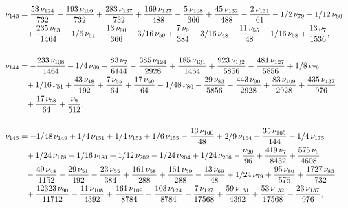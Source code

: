 \documentclass[a4paper,12pt, DIV=14, BCOR=5mm, twoside, headsepline]{scrbook}
\begin{document}
\begin{align}\label{AreaSol13}
\begin{aligned}
\\
\nu_{{143}}&={\frac {53\,\nu_{{124}}}{732}}-{\frac {193\,\nu_{{
109}}}{732}}+{\frac {283\,\nu_{{137}}}{732}}+{\frac {169\,\nu_{{127}}
}{488}}-{\frac {5\,\nu_{{108}}}{366}}+{\frac {45\,\nu_{{132}}}{488}}-{
\frac {2\,\nu_{{131}}}{61}}-1/2\,\nu_{{79}}-1/12\,\nu_{{80}}\\
 &\hphantom{=}+{\frac {
235\,\nu_{{83}}}{1464}}-1/6\,\nu_{{51}}-{\frac {13\,\nu_{{90}}}{366}}-
3/16\,\nu_{{59}}+{\frac {7\,\nu_{{9}}}{384}}-3/16\,\nu_{{48}}-{\frac {
11\,\nu_{{55}}}{48}}-1/16\,\nu_{{58}}+{\frac {13\,\nu_{{7}}}{1536}},\\
\\
\nu_{{144}}&=-{\frac {233\,\nu_{{108}}}{1464}}-1/4\,\nu_{{69}}-{\frac {
83\,\nu_{{7}}}{6144}}-{\frac {385\,\nu_{{124}}}{2928}}+{\frac {185\,
\nu_{{131}}}{1464}}+{\frac {923\,\nu_{{132}}}{5856}}-{\frac {481\,\nu_
{{127}}}{5856}}+1/8\,\nu_{{79}}\\
 &\hphantom{=}+1/16\,\nu_{{51}}+{\frac {43\,\nu_{{48}
}}{192}}+{\frac {7\,\nu_{{55}}}{64}}+{\frac {17\,\nu_{{59}}}{64}}-1/48
\,\nu_{{80}}-{\frac {29\,\nu_{{83}}}{5856}}-{\frac {443\,\nu_{{90}}}{
2928}}+{\frac {83\,\nu_{{109}}}{2928}}+{\frac {435\,\nu_{{137}}}{976}}
\\
 &\hphantom{=}+{\frac {17\,\nu_{{58}}}{64}}+{\frac {\nu_{{9}}}{512}}, \\
\\
\nu_{{145}}&=-1/
48\,\nu_{{149}}+1/4\,\nu_{{151}}+1/4\,\nu_{{153}}+1/6\,\nu_{{155}}-{
\frac {13\,\nu_{{160}}}{48}}+2/9\,\nu_{{164}}+{\frac {35\,\nu_{{165}}
}{144}}+1/4\,\nu_{{175}}\\
 &\hphantom{=}+1/24\,\nu_{{178}}+1/16\,\nu_{{181}}+1/12\,\nu
_{{202}}-1/24\,\nu_{{204}}+1/24\,\nu_{{206}}-{\frac {\nu_{{20}}}{96}}+
{\frac {419\,\nu_{{7}}}{18432}}+{\frac {575\,\nu_{{9}}}{4608}}\\
 &\hphantom{=}-{\frac 
{49\,\nu_{{48}}}{1152}}-{\frac {29\,\nu_{{51}}}{192}}-{\frac {23\,\nu_
{{55}}}{384}}+{\frac {161\,\nu_{{58}}}{288}}+{\frac {161\,\nu_{{59}}}{
288}}-{\frac {13\,\nu_{{69}}}{48}}+1/24\,\nu_{{79}}+{\frac {95\,\nu_{{
80}}}{576}}+{\frac {1727\,\nu_{{83}}}{732}}\\
 &\hphantom{=}+{\frac {12323\,\nu_{{90}}
}{11712}}-{\frac {11\,\nu_{{108}}}{4392}}+{\frac {161\,\nu_{{109}}}{
8784}}-{\frac {103\,\nu_{{124}}}{8784}}-{\frac {7\,\nu_{{127}}}{17568}
}+{\frac {59\,\nu_{{131}}}{4392}}+{\frac {53\,\nu_{{132}}}{17568}}-{
\frac {23\,\nu_{{137}}}{976}}, \\

\end{aligned}
\end{align}
\end{document}
